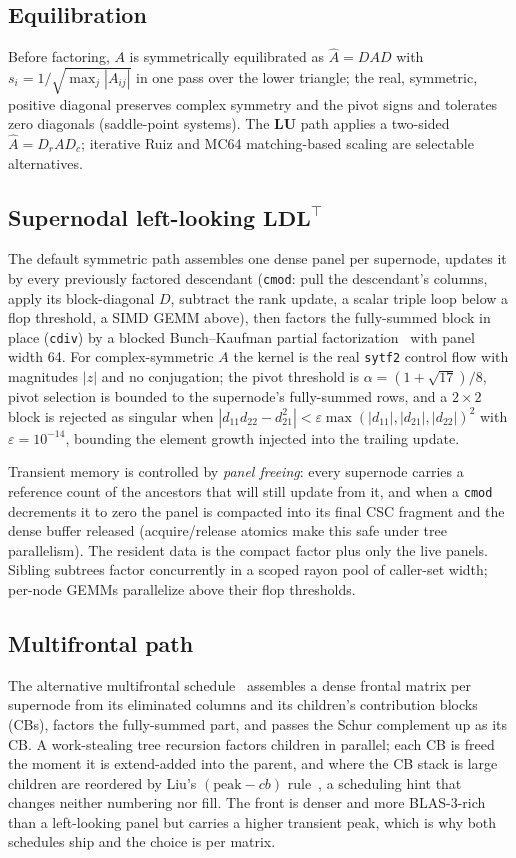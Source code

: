 \documentclass[11pt,a4paper]{article}
\newcommand{\code}[1]{\texttt{\small #1}}
\newcommand{\LDLt}{\mathbf{L}\mathbf{D}\mathbf{L}^{\!\top}}
\newcommand{\LU}{\mathbf{L}\mathbf{U}}
\begin{document}
\subsection{Equilibration}
Before factoring, $A$ is symmetrically equilibrated as $\hat A=DAD$ with
$s_i=1/\sqrt{\max_j|A_{ij}|}$ in one pass over the lower triangle; the real, symmetric,
positive diagonal preserves complex symmetry and the pivot signs and tolerates zero
diagonals (saddle-point systems). The $\LU$ path applies a two-sided $\hat A=D_rAD_c$;
iterative Ruiz and MC64 matching-based scaling are selectable alternatives.

\subsection{Supernodal left-looking \texorpdfstring{$\LDLt$}{LDLt}}
The default symmetric path assembles one dense panel per supernode, updates it by every
previously factored descendant (\code{cmod}: pull the descendant's columns, apply its
block-diagonal $D$, subtract the rank update, a scalar triple loop below a flop
threshold, a SIMD GEMM above), then factors the fully-summed block in place (\code{cdiv})
by a blocked Bunch--Kaufman partial factorization~\cite{bunchkaufman} with panel width
64. For complex-symmetric $A$ the kernel is the real \code{sytf2} control flow with
magnitudes $|z|$ and no conjugation; the pivot threshold is
$\alpha=(1+\sqrt{17})/8$, pivot selection is bounded to the supernode's fully-summed
rows, and a $2\times2$ block is rejected as singular when
$|d_{11}d_{22}-d_{21}^2|<\varepsilon\max(|d_{11}|,|d_{21}|,|d_{22}|)^2$ with
$\varepsilon=10^{-14}$, bounding the element growth injected into the trailing update.

Transient memory is controlled by \emph{panel freeing}: every supernode carries a
reference count of the ancestors that will still update from it, and when a \code{cmod}
decrements it to zero the panel is compacted into its final CSC fragment and the dense
buffer released (acquire/release atomics make this safe under tree parallelism). The
resident data is the compact factor plus only the live panels. Sibling subtrees factor
concurrently in a scoped rayon pool of caller-set width; per-node GEMMs parallelize above
their flop thresholds.

\subsection{Multifrontal path}
The alternative multifrontal schedule~\cite{duffreid,liumf} assembles a dense frontal
matrix per supernode from its eliminated columns and its children's contribution blocks
(CBs), factors the fully-summed part, and passes the Schur complement up as its CB. A
work-stealing tree recursion factors children in parallel; each CB is freed the moment it
is extend-added into the parent, and where the CB stack is large children are reordered
by Liu's $(\text{peak}-cb)$ rule~\cite{liu86}, a scheduling hint that changes neither
numbering nor fill. The front is denser and more BLAS-3-rich than a left-looking panel
but carries a higher transient peak, which is why both schedules ship and the choice is
per matrix.
\end{document}
